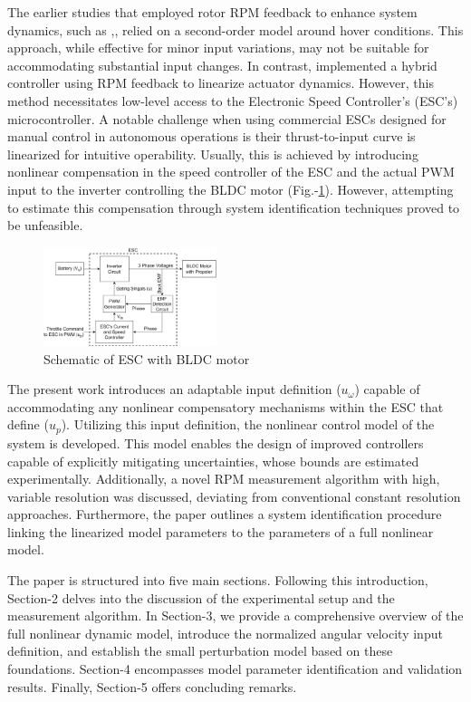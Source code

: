 The earlier studies that employed rotor RPM feedback to enhance system
dynamics, such as
\cite{pounds2009design},\cite{pounds2007system},\cite{mahony2012multirotor}
relied on a second-order model around hover conditions. This approach, while
effective for minor input variations, may not be suitable for accommodating
substantial input changes. In contrast, \cite{franchi2017adaptive} implemented
a hybrid controller using RPM feedback to linearize actuator dynamics. However,
this method necessitates low-level access to the Electronic Speed Controller's
(ESC's) microcontroller. A notable challenge when using commercial ESCs designed for manual control in autonomous operations
is their thrust-to-input curve is linearized for intuitive
operability. Usually, this is achieved by introducing nonlinear compensation in
the speed controller of the ESC and the actual PWM input to the inverter
controlling the BLDC motor (Fig.-\ref{fig::bldc_diag}). However, attempting to
estimate this compensation through system identification techniques proved to
be unfeasible.
\begin{figure}[h]
    \centering
    \includegraphics[width = 0.45\textwidth]{./figs/figs_acc/schematic/esc_schematic.png}
    \caption{Schematic of ESC with BLDC motor}
    \label{fig::bldc_diag}
\end{figure}

The present work introduces an adaptable input definition ($u_\omega$) capable of accommodating any nonlinear compensatory mechanisms within the ESC that define ($u_p$). Utilizing this input definition, the nonlinear control model of the system is developed. This model enables the design of improved controllers capable of explicitly mitigating uncertainties, whose bounds are estimated experimentally. Additionally, a novel RPM measurement algorithm with high, variable resolution was discussed, deviating from conventional constant resolution approaches. Furthermore, the paper outlines a system identification procedure linking the linearized model parameters to the parameters of a full nonlinear model.

The paper is structured into five main sections. Following this introduction,
Section-2 delves into the discussion of the experimental setup and the
measurement algorithm. In Section-3, we provide a comprehensive overview of the
full nonlinear dynamic model, introduce the normalized angular velocity input
definition, and establish the small perturbation model based on these
foundations. Section-4 encompasses model parameter identification and validation
results. Finally, Section-5 offers concluding remarks.
